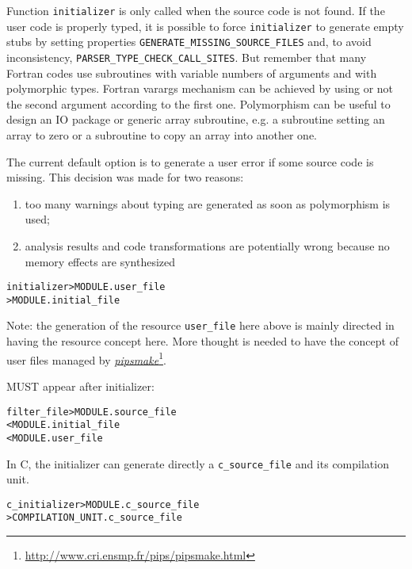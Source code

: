 \documentclass[a4paper]{report}
\newenvironment{PipsMake}{\begin{alltt}}{\end{alltt}}
\newcommand{\LINK}[2]{\href{#2}{#1}\footnote{\url{#2}}\xspace}
\newcommand{\PIPSMAKE}{\LINK{\emph{pipsmake}}{http://www.cri.ensmp.fr/pips/pipsmake.html}\xspace}
\begin{document}
Function \verb/initializer/ is only called when the source code is not
found. If the user code is properly typed, it is possible to force
\verb/initializer/ to generate empty stubs by setting properties
\verb/GENERATE_MISSING_SOURCE_FILES/ and, to avoid inconsistency,
\verb/PARSER_TYPE_CHECK_CALL_SITES/. But remember that many Fortran codes
use subroutines with variable numbers of arguments and with polymorphic
types. Fortran varargs mechanism can be achieved by using or not the
second argument according to the first one. Polymorphism can be useful to
design an IO package or generic array subroutine, e.g. a subroutine
setting an array to zero or a subroutine to copy an array into another
one.

The current default option is to generate a user error if some source code
is missing. This decision was made for two reasons:

\begin{enumerate}

\item too many warnings about typing are generated as soon as polymorphism
  is used;

\item analysis results and code transformations are potentially wrong
  because no memory effects are synthesized

\end{enumerate}


\begin{PipsMake}
initializer                     > MODULE.user_file
                                > MODULE.initial_file
\end{PipsMake}


Note: the generation of the resource \verb|user_file| here above is mainly
directed in having the resource concept here. More thought is needed to
have the concept of user files managed by \PIPSMAKE.

MUST appear after initializer:

\begin{PipsMake}
filter_file                     > MODULE.source_file
                < MODULE.initial_file
                < MODULE.user_file
\end{PipsMake}


In C, the initializer can generate directly a \verb|c_source_file| and
its compilation unit.

\begin{PipsMake}
c_initializer                     > MODULE.c_source_file
                                  > COMPILATION_UNIT.c_source_file
\end{PipsMake}
\end{document}
